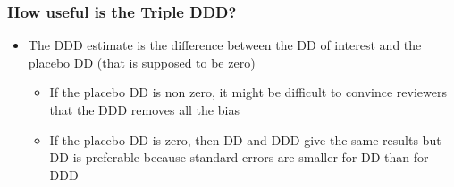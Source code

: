 \documentclass{beamer}
\numberwithin{equation}{section}
\begin{document}
\begin{frame}
  \frametitle{How useful is the Triple DDD?}
\begin{itemize}
  \item The DDD estimate is the difference between the DD of interest and the placebo DD (that is supposed to be zero)\bigskip
  \begin{itemize}
    \item If the placebo DD is non zero, it might be difficult to convince reviewers that the DDD removes all the bias\medskip
    \item If the placebo DD is zero, then DD and DDD give the same results but DD is preferable because standard errors are smaller for DD than for DDD
  \end{itemize}
\end{itemize}
\end{frame}

 
\end{document}
